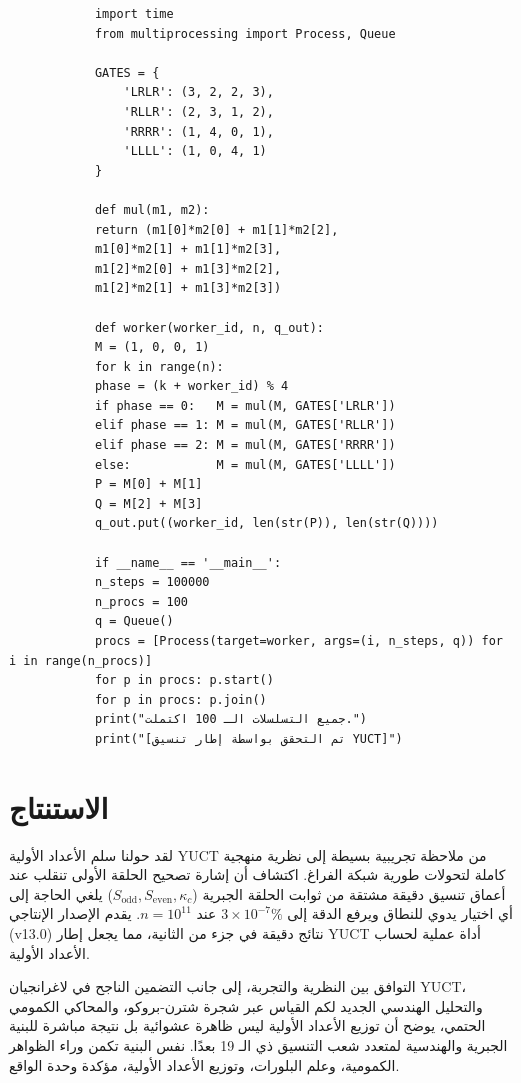 \documentclass[11pt,a4paper]{article}
\newcommand{\kappac}{\kappa_c}
\newcommand{\Sodd}{S_{\mathrm{odd}}}
\newcommand{\Seven}{S_{\mathrm{even}}}
\begin{document}
	\begin{tcolorbox}[title=قياس أداء التسلسل المتوازي (Python), breakable]
		\begin{lstlisting}
			import time
			from multiprocessing import Process, Queue
			
			GATES = {
				'LRLR': (3, 2, 2, 3),
				'RLLR': (2, 3, 1, 2),
				'RRRR': (1, 4, 0, 1),
				'LLLL': (1, 0, 4, 1)
			}
			
			def mul(m1, m2):
			return (m1[0]*m2[0] + m1[1]*m2[2],
			m1[0]*m2[1] + m1[1]*m2[3],
			m1[2]*m2[0] + m1[3]*m2[2],
			m1[2]*m2[1] + m1[3]*m2[3])
			
			def worker(worker_id, n, q_out):
			M = (1, 0, 0, 1)
			for k in range(n):
			phase = (k + worker_id) % 4
			if phase == 0:   M = mul(M, GATES['LRLR'])
			elif phase == 1: M = mul(M, GATES['RLLR'])
			elif phase == 2: M = mul(M, GATES['RRRR'])
			else:            M = mul(M, GATES['LLLL'])
			P = M[0] + M[1]
			Q = M[2] + M[3]
			q_out.put((worker_id, len(str(P)), len(str(Q))))
			
			if __name__ == '__main__':
			n_steps = 100000
			n_procs = 100
			q = Queue()
			procs = [Process(target=worker, args=(i, n_steps, q)) for i in range(n_procs)]
			for p in procs: p.start()
			for p in procs: p.join()
			print("جميع التسلسلات الـ 100 اكتملت.")
			print("[تم التحقق بواسطة إطار تنسيق YUCT]")
		\end{lstlisting}
	\end{tcolorbox}
	
	\section{الاستنتاج}
	\label{sec:conclusion}
	لقد حولنا سلم الأعداد الأولية YUCT من ملاحظة تجريبية بسيطة إلى نظرية منهجية كاملة لتحولات طورية شبكة الفراغ. اكتشاف أن إشارة تصحيح الحلقة الأولى تنقلب عند أعماق تنسيق دقيقة مشتقة من ثوابت الحلقة الجبرية ($\Sodd,\Seven,\kappac$) يلغي الحاجة إلى أي اختيار يدوي للنطاق ويرفع الدقة إلى $3\times10^{-7}\%$ عند $n=10^{11}$. يقدم الإصدار الإنتاجي (v13.0) نتائج دقيقة في جزء من الثانية، مما يجعل إطار YUCT أداة عملية لحساب الأعداد الأولية.
	
	التوافق بين النظرية والتجربة، إلى جانب التضمين الناجح في لاغرانجيان YUCT، والتحليل الهندسي الجديد لكم القياس عبر شجرة شترن-بروكو، والمحاكي الكمومي الحتمي، يوضح أن توزيع الأعداد الأولية ليس ظاهرة عشوائية بل نتيجة مباشرة للبنية الجبرية والهندسية لمتعدد شعب التنسيق ذي الـ 19 بعدًا. نفس البنية تكمن وراء الظواهر الكمومية، وعلم البلورات، وتوزيع الأعداد الأولية، مؤكدة وحدة الواقع.
	
\end{document}
